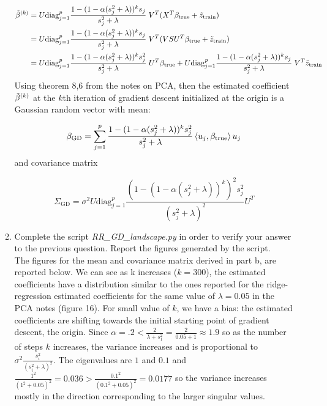 \documentclass[12pt,twoside]{article}
\begin{document}
\begin{enumerate}
\begin{enumerate}
\begin{align*}
	\tilde{ \beta }^{\left( k \right)} &=  U  \text{diag}_{j=1}^p \frac{ 1 - ( 1 - \alpha (s_j^2 + \lambda))^{k} s_j}{s_j^2 + \lambda}  \;  V^T (X^T \beta_{\operatorname{true}} + \tilde{ z }_{\operatorname{train}} )\\
					&=  U  \text{diag}_{j=1}^p \frac{ 1 - ( 1 - \alpha (s_j^2 + \lambda))^{k} s_j}{s_j^2 + \lambda}  \;  V^T (V S U^T \beta_{\operatorname{true}} + \tilde{ z }_{\operatorname{train}} )\\
					&=  U  \text{diag}_{j=1}^p \frac{ 1 - ( 1 - \alpha (s_j^2 + \lambda))^{k} s_j^2}{s_j^2 + \lambda}  \; U^T \beta_{\operatorname{true}} 
					+      U  \text{diag}_{j=1}^p \frac{ 1 - ( 1 - \alpha (s_j^2 + \lambda))^{k} s_j}{s_j^2 + \lambda}  \;  V^T  \tilde{ z }_{\operatorname{train}} \\
\end{align*}
Using theorem 8,6 from the notes on PCA, then  the estimated coefficient $\tilde{ \beta }^{\left( k \right)}$ at the $k$th iteration of gradient descent initialized at the origin is a Gaussian random vector  with mean:

$$ \beta_{\text{GD}}  = \sum_{j=1}^p  \frac{ 1 - ( 1 - \alpha (s_j^2 + \lambda))^{k} s_j^2}{s_j^2 + \lambda}  \left \langle u_j, \beta_{\operatorname{true}}\right \rangle u_j $$
and covariance matrix

$$ \Sigma_{\text{GD}} = \sigma^2 U  \text{diag}_{j=1}^p \frac{ (1 - ( 1 - \alpha (s_j^2 + \lambda))^{k})^2 s_j^2}{(s_j^2 + \lambda)^2}  U^T $$

\item Complete the script \emph{RR\_GD\_landscape.py} in order to verify your answer to the previous question. Report the figures generated by the script.\\

The figures for the mean and covariance matrix derived in part b, are reported below. We can see as k increases ($k=300$), the estimated coefficients have a distribution similar to the ones reported for the ridge-regression estimated coefficients
for the same value of $\lambda=0.05$ in the PCA notes (figure 16).  
For small value of $k$, we have a bias: the estimated coefficients are shifting towards the initial starting point of gradient descent, the origin.
Since $\alpha=.2 < \frac{2}{\lambda + s_1^2} =   \frac{2}{0.05+ 1} \approx 1.9$ so as the number of steps  $k$ increases, the variance increases and is proportional to $\sigma^2 \frac{s_i^2}{(s_i^2 + \lambda)^2}$.
The eigenvalues are $1$ and $0.1$  and $\frac{1^2}{(1^2 + 0.05)^2} = 0.036 >  \frac{0.1^2}{(0.1^2 + 0.05)^2} = 0.0177$ so the variance increases mostly in the direction corresponding to the larger singular values. 


\end{enumerate}
\end{enumerate}
\end{document}
